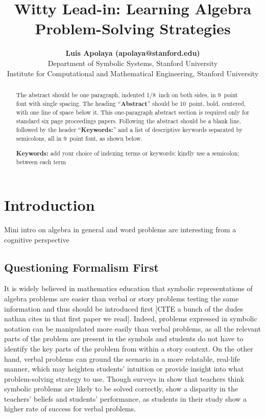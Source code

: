 \documentclass[10pt,letterpaper]{article}
\title{Witty Lead-in: Learning Algebra Problem-Solving Strategies}
\author{{\large \bf Luis Apolaya (apolaya@stanford.edu)} \\
  Department of Symbolic Systems, Stanford University
  \AND {\large \bf Amy Shoemaker (amyshoe@stanford.edu)} \\
  Institute for Computational and Mathematical Engineering, Stanford University}
\begin{document}
\maketitle


\begin{abstract}
The abstract should be one paragraph, indented 1/8~inch on both sides,
in 9~point font with single spacing. The heading ``{\bf Abstract}''
should be 10~point, bold, centered, with one line of space below
it. This one-paragraph abstract section is required only for standard
six page proceedings papers. Following the abstract should be a blank
line, followed by the header ``{\bf Keywords:}'' and a list of
descriptive keywords separated by semicolons, all in 9~point font, as
shown below.

\textbf{Keywords:} 
add your choice of indexing terms or keywords; kindly use a
semicolon; between each term
\end{abstract}


\section{Introduction}

Mini intro on algebra in general and word problems are interesting from a cognitive perspective

\subsection{Questioning Formalism First}

It is widely believed in mathematics education that symbolic representations of algebra problems are easier than verbal or story problems testing the same information and thus should be introduced first [CITE a bunch of the dudes nathan cites in that first paper we read]. Indeed, problems expressed in symbolic notation can be manipulated more easily than verbal problems, as all the relevant parts of the problem are present in the symbols and students do not have to identify the key parts of the problem from within a story context. On the other hand, verbal problems can ground the scenario in a more relatable, real-life manner, which may heighten students’ intuition or provide insight into what problem-solving strategy to use. Though surveys in  show that teachers think symbolic problems are likely to be solved correctly,  show a disparity in the teachers' beliefs and students' performance, as students in their study show a higher rate of success for verbal problems.
\end{document}
